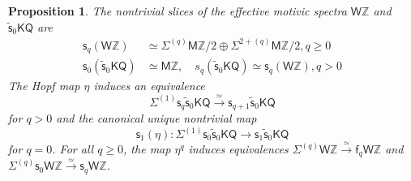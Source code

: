 \documentclass[11pt,hyp,english]{article}
\newcommand{\Z}{\mathbb{Z}}
\newcommand{\KQ}{\mathsf{KQ}}
\newcommand{\HZ}{\mathsf{M}\Z}
\newcommand{\cHZ}{\wt{{\mathsf{M}}}{\Z}}
\newcommand{\HWZ}{\mathsf{W}\Z}
\newcommand{\wt}[1]{\widetilde{#1}}
\newcommand{\s}{\mathsf{s}}
\newcommand{\vs}{\tilde{\mathsf{s}}}
\newcommand{\f}{\mathsf{f}}
\newtheorem{proposition}[theorem]{Proposition}
\theoremstyle{definition}
\begin{document}
\begin{proposition}
\label{prop:slices-cHZ}
The nontrivial slices of the effective motivic spectra $\HWZ$ and $\vs_{0}\KQ $ are 
\begin{align*}
\s_{q}(\HWZ) &\simeq \Sigma^{(q)}\HZ/2 \oplus \Sigma^{2+(q)}\HZ/2, q \geq 0 \\
\s_0(\vs_{0}\KQ ) & \simeq \HZ, \quad s_{q}(\vs_{0}\KQ ) \simeq \s_{q}(\HWZ), q > 0 
\end{align*}
The Hopf map $\eta$ induces an equivalence
\[  
\Sigma^{(1)}\s_{q}\vs_{0}\KQ \xrightarrow{\simeq} \s_{q+1}\vs_{0}\KQ  
\]
for $q>0$ and the canonical unique nontrivial map  
\[ 
\s_1(\eta)\colon \Sigma^{(1)}\s_0\vs_{0}\KQ \to \s_1\vs_{0}\KQ 
\] 
for $q=0$. For all $q\geq 0$, the map $\eta^q$ induces equivalences
$\Sigma^{(q)}\HWZ\xrightarrow{\simeq} \f_q\HWZ$ and 
$\Sigma^{(q)}\s_0\HWZ\xrightarrow{\simeq} \s_q\HWZ$.
\end{proposition}
\end{document}
